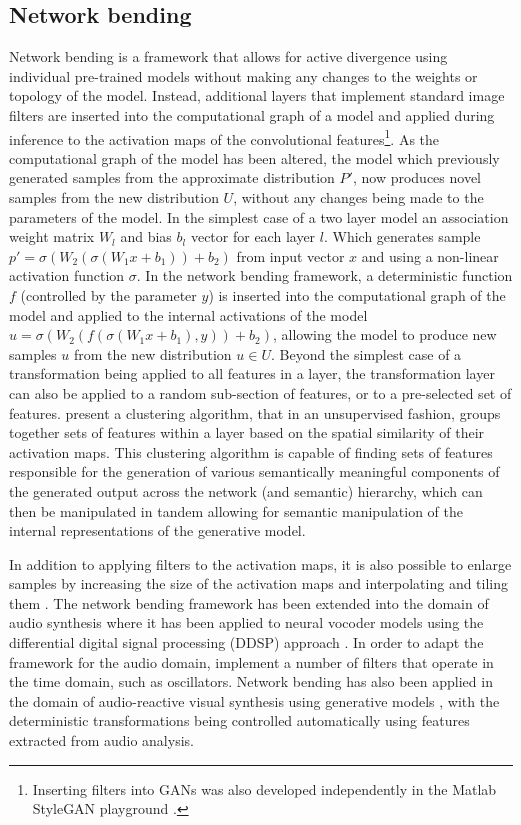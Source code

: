 \subsection{Network bending}
\label{survey:bending}

Network bending \citep{broad2021network} is a framework that allows for active divergence using individual pre-trained models without making any changes to the weights or topology of the model. 
Instead, additional layers that implement standard image filters are inserted into the computational graph of a model and applied during inference to the activation maps of the convolutional features\footnote{
    Inserting filters into GANs was also developed independently in the Matlab StyleGAN playground \citep{pinkney2020matlab}.}. 
As the computational graph of the model has been altered, the model which previously generated samples from the approximate distribution $P'$, now produces novel samples from the new distribution $U$, without any changes being made to the parameters of the model. 
In the simplest case of a two layer model an association weight matrix $W_l$ and bias $b_l$ vector for each layer $l$. 
Which generates sample $p'=\sigma(W_2(\sigma(W_1x+b_1))+b_2)$ from input vector $x$ and using a non-linear activation function $\sigma$. 
In the network bending framework, a deterministic function $f$ (controlled by the parameter $y$) is inserted into the computational graph of the model and applied to the internal activations of the model $u=\sigma(W_2(f(\sigma(W_1x+b_1),y))+b_2)$, allowing the model to produce new samples $u$ from the new distribution $u \in U$. Beyond the simplest case of a transformation being applied to all features in a layer, the transformation layer can also be applied to a random sub-section of features, or to a pre-selected set of features. 
\citet{broad2021network} present a clustering algorithm, that in an unsupervised fashion, groups together sets of features within a layer based on the spatial similarity of their activation maps. 
This clustering algorithm is capable of finding sets of features responsible for the generation of various semantically meaningful components of the generated output across the network (and semantic) hierarchy, which can then be manipulated in tandem allowing for semantic manipulation of the internal representations of the generative model. 

In addition to applying filters to the activation maps, it is also possible to enlarge samples by increasing the size of the activation maps and interpolating and tiling them \citep{pouliot2020gan}. 
The network bending framework has been extended into the domain of audio synthesis \citep{mccallum2020network} where it has been applied to neural vocoder models using the differential digital signal processing (DDSP) approach \citep{engel2020ddsp}. 
In order to adapt the framework for the audio domain, \citet{mccallum2020network} implement a number of filters that operate in the time domain, such as oscillators. Network bending has also been applied in the domain of audio-reactive visual synthesis using generative models \citep{brouwer2020audio}, with the deterministic transformations being controlled automatically using features extracted from audio analysis.

